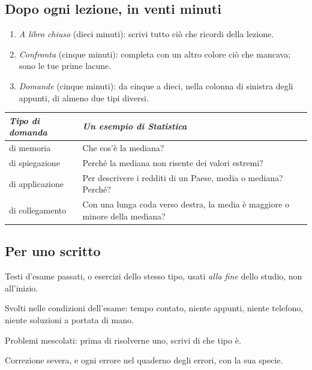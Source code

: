 \subsection*{Dopo ogni lezione, in venti minuti}

\begin{enumerate}[leftmargin=1.4em]
  \item \emph{A libro chiuso} (dieci minuti): scrivi tutto ciò che
        ricordi della lezione.
  \item \emph{Confronta} (cinque minuti): completa con un altro colore
        ciò che mancava; sono le tue prime lacune.
  \item \emph{Domande} (cinque minuti): da cinque a dieci, nella colonna
        di sinistra degli appunti, di almeno due tipi diversi.
\end{enumerate}

\begin{center}\small
  \begin{tabular}{@{}>{\raggedright\arraybackslash}p{}>{\raggedright\arraybackslash}p{}@{}}
    \toprule
    \textit{Tipo di domanda} & \textit{Un esempio di Statistica} \\
    \midrule
    di memoria & Che cos'è la mediana? \\
    di spiegazione & Perché la mediana non risente dei valori estremi? \\
    di applicazione & Per descrivere i redditi di un Paese, media o
      mediana? Perché? \\
    di collegamento & Con una lunga coda verso destra, la media è
      maggiore o minore della mediana? \\
    \bottomrule
  \end{tabular}
\end{center}

\subsection*{Per uno scritto}

\begin{controlli}
  \item Testi d'esame passati, o esercizi dello stesso tipo, usati
        \emph{alla fine} dello studio, non all'inizio.
  \item Svolti nelle condizioni dell'esame: tempo contato, niente
        appunti, niente telefono, niente soluzioni a portata di mano.
  \item Problemi mescolati: prima di risolverne uno, scrivi di che tipo
        è.
  \item Correzione severa, e ogni errore nel quaderno degli errori, con
        la sua specie.
\end{controlli}

